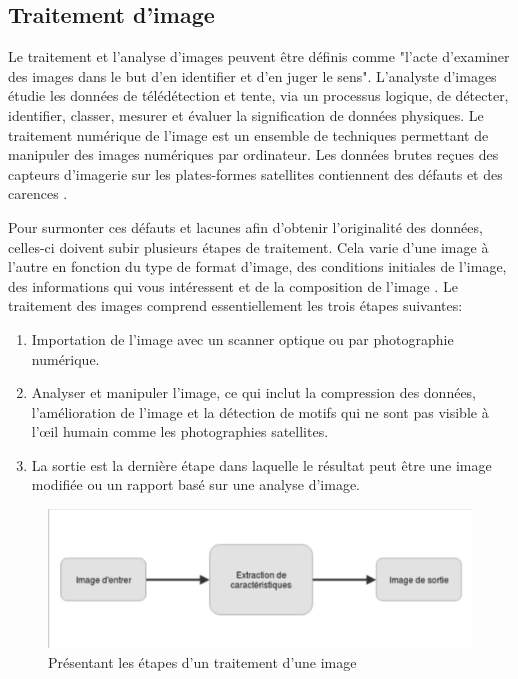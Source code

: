 \documentclass[12pt]{article}
\begin{document}
\subsection{Traitement d’image}
Le traitement et l'analyse d'images peuvent être définis comme "l'acte d'examiner des images dans le but d'en identifier et d'en juger le sens". L'analyste d'images étudie les données de télédétection et tente, via un processus logique, de détecter, identifier, classer, mesurer et évaluer la signification de données physiques. Le traitement numérique de l'image est un ensemble de techniques permettant de manipuler des images numériques par ordinateur. Les données brutes reçues des capteurs d’imagerie sur les plates-formes satellites contiennent des défauts et des carences \cite{14}.

Pour surmonter ces défauts et lacunes afin d'obtenir l'originalité des données, celles-ci doivent subir plusieurs étapes de traitement. Cela varie d'une image à l'autre en fonction du type de format d'image, des conditions initiales de l'image, des informations qui vous intéressent et de la composition de l'image \cite{14}.
Le traitement des images comprend essentiellement les trois étapes suivantes:
\begin{enumerate}
	\item Importation de l'image avec un scanner optique ou par photographie numérique.
	\item Analyser et manipuler l'image, ce qui inclut la compression des données, l'amélioration de l'image et la détection de motifs qui ne sont pas visible à l’œil humain comme les photographies satellites.
	\item La sortie est la dernière étape dans laquelle le résultat peut être une image modifiée ou un rapport basé sur une analyse d'image.
\end{enumerate}
\begin{figure}[h]
\centering
\includegraphics[scale=1, width=13cm]{img-Chapiter-1/1.png}
\caption{Présentant les étapes d’un traitement d’une image}
\end{figure}
\end{document}
